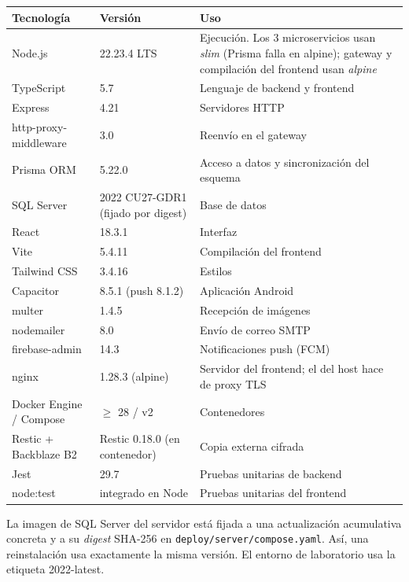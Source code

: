 \documentclass[11pt,a4paper,oneside]{report}
\newcommand{\codus}{\textunderscore\allowbreak}
\DeclareRobustCommand{\cod}[1]{{\small\ttfamily\let\_\codus #1}}
\DeclareRobustCommand{\ruta}[1]{{\small\nolinkurl{#1}}}
\newcommand{\cabecera}{\rowcolor{utaRojo!12}}
\begin{document}
\begin{center}
\begin{tabularx}{\linewidth}{@{}P{4.4cm}P{3.6cm}L@{}}
\toprule
\cabecera \textbf{Tecnología} & \textbf{Versión} & \textbf{Uso} \\
\midrule
Node.js & 22.23.4 LTS & Ejecución. Los 3 microservicios usan \emph{slim} (Prisma falla en alpine); gateway y compilación del frontend usan \emph{alpine} \\
TypeScript & 5.7 & Lenguaje de backend y frontend \\
Express & 4.21 & Servidores HTTP \\
http-proxy-middleware & 3.0 & Reenvío en el gateway \\
Prisma ORM & 5.22.0 & Acceso a datos y sincronización del esquema \\
SQL Server & 2022 CU27-GDR1 (fijado por digest) & Base de datos \\
React & 18.3.1 & Interfaz \\
Vite & 5.4.11 & Compilación del frontend \\
Tailwind CSS & 3.4.16 & Estilos \\
Capacitor & 8.5.1 (push 8.1.2) & Aplicación Android \\
multer & 1.4.5 & Recepción de imágenes \\
nodemailer & 8.0 & Envío de correo SMTP \\
firebase-admin & 14.3 & Notificaciones push (FCM) \\
nginx & 1.28.3 (alpine) & Servidor del frontend; el del host hace de proxy TLS \\
Docker Engine / Compose & $\geq$ 28 / v2 & Contenedores \\
Restic + Backblaze B2 & Restic 0.18.0 (en contenedor) & Copia externa cifrada \\
Jest & 29.7 & Pruebas unitarias de backend \\
\cod{node:test} & integrado en Node & Pruebas unitarias del frontend \\
\bottomrule
\end{tabularx}
\end{center}

\begin{nota}
La imagen de SQL Server del servidor está fijada a una actualización acumulativa concreta y a
su \emph{digest} SHA-256 en \ruta{deploy/server/compose.yaml}. Así, una reinstalación usa
exactamente la misma versión. El entorno de laboratorio usa la etiqueta \cod{2022-latest}.
\end{nota}
\end{document}
